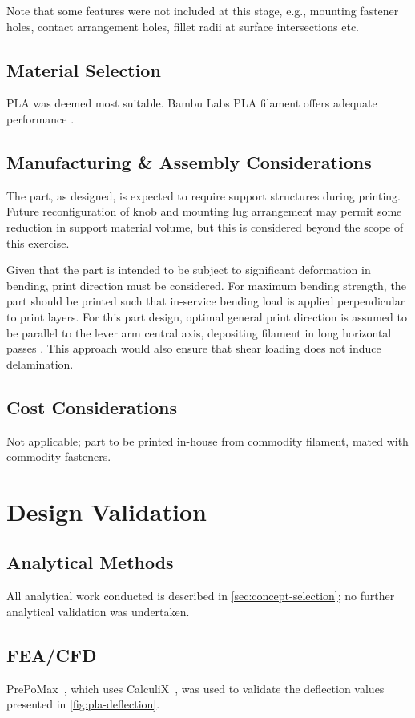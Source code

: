 \documentclass[10pt]{article}
\begin{document}
Note that some features were not included at this stage, e.g., mounting fastener holes, contact
arrangement holes, fillet radii at surface intersections etc.

\subsection{Material Selection}
PLA was deemed most suitable. Bambu Labs PLA filament offers adequate performance
\cite{bambulab_pla2025}. %

\subsection{Manufacturing \& Assembly Considerations}
The part, as designed, is expected to require support structures during printing. Future
reconfiguration of knob and mounting lug arrangement may permit some reduction in support material
volume, but this is considered beyond the scope of this exercise.

Given that the part is intended to be subject to significant deformation in bending, print
direction must be considered. For maximum bending strength, the part should be printed such that
in-service bending load is applied perpendicular to print layers. For this part design, optimal
general print direction is assumed to be parallel to the lever arm central axis, depositing
filament in long horizontal passes \cite{protolabs2025}. This approach would also ensure that shear
loading does not induce delamination. %

\subsection{Cost Considerations}
Not applicable; part to be printed in-house from commodity filament, mated with commodity
fasteners.

\section{Design Validation}
\subsection{Analytical Methods}
All analytical work conducted is described in \autoref{sec:concept-selection}; no further
analytical validation was undertaken.

\subsection{FEA/CFD}
PrePoMax~\cite{prepomax2025}, which uses CalculiX~\cite{calculix2025}, was used to validate the
deflection values presented in \autoref{fig:pla-deflection}.
\end{document}
